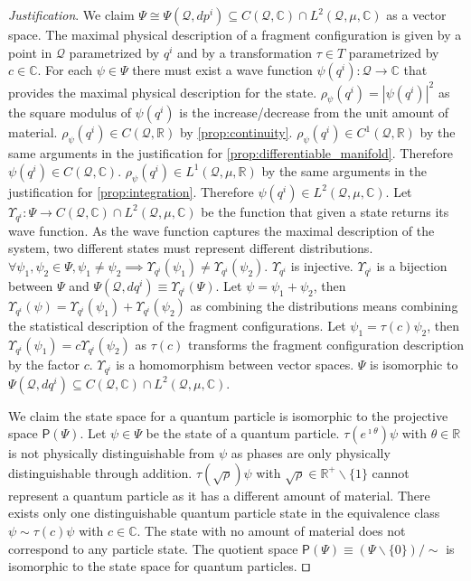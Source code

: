 \documentclass[smallextended]{svjour3}
\numberwithin{equation}{section}
\newenvironment{justification}{\emph{Justification}.}{\hfill\(\qed\)}
\begin{document}
\begin{justification}
	We claim $\Psi \cong \Psi(\mathcal{Q}, dp^i) \subseteq C(\mathcal{Q}, \mathbb{C}) \cap L^2(\mathcal{Q}, \mu, \mathbb{C})$ as a vector space. The maximal physical description of a fragment configuration is given by a point in $\mathcal{Q}$ parametrized by $q^i$ and by a transformation $\tau \in T$ parametrized by $c \in \mathbb{C}$. For each $\psi \in \Psi$ there must exist a wave function $\psi(q^i) : \mathcal{Q} \rightarrow \mathbb{C}$ that provides the maximal physical description for the state. $\rho_\psi(q^i) = |\psi(q^i)|^2$ as the square modulus of $\psi(q^i)$ is the increase/decrease from the unit amount of material. $\rho_\psi(q^i) \in C(\mathcal{Q}, \mathbb{R})$ by \ref{prop:continuity}. $\rho_\psi(q^i) \in C^1(\mathcal{Q}, \mathbb{R})$ by the same arguments in the justification for \ref{prop:differentiable_manifold}. Therefore $\psi(q^i) \in C(\mathcal{Q}, \mathbb{C})$. $\rho_\psi(q^i) \in L^1(\mathcal{Q}, \mu, \mathbb{R})$ by the same arguments in the justification for \ref{prop:integration}. Therefore $\psi(q^i) \in L^2(\mathcal{Q}, \mu, \mathbb{C})$. Let $\Upsilon_{q^i} : \Psi \rightarrow C(\mathcal{Q}, \mathbb{C}) \cap L^2(\mathcal{Q}, \mu, \mathbb{C})$ be the function that given a state returns its wave function. As the wave function captures the maximal description of the system, two different states must represent different distributions. $\forall \psi_1, \psi_2 \in \Psi, \psi_1 \neq \psi_2 \implies \Upsilon_{q^i}(\psi_1) \neq \Upsilon_{q^i}(\psi_2)$. $\Upsilon_{q^i}$ is injective. $\Upsilon_{q^i}$ is a bijection between $\Psi$ and $\Psi(\mathcal{Q}, dq^i)\equiv\Upsilon_{q^i}(\Psi)$. Let $\psi=\psi_1+\psi_2$, then $\Upsilon_{q^i}(\psi)=\Upsilon_{q^i}(\psi_1)+\Upsilon_{q^i}(\psi_2)$ as combining the distributions means combining the statistical description of the fragment configurations. Let $\psi_1=\tau(c)\psi_2$, then $\Upsilon_{q^i}(\psi_1)=c \Upsilon_{q^i}(\psi_2)$ as $\tau(c)$ transforms the fragment configuration description by the factor $c$. $\Upsilon_{q^i}$ is a homomorphism between vector spaces. $\Psi$ is isomorphic to $\Psi(\mathcal{Q}, dq^i) \subseteq C(\mathcal{Q}, \mathbb{C}) \cap L^2(\mathcal{Q}, \mu, \mathbb{C})$.
	
	We claim the state space for a quantum particle is isomorphic to the projective space $\mathsf{P}(\Psi)$. Let $\psi \in \Psi$ be the state of a quantum particle. $\tau(e^{\imath \theta}) \psi$ with $\theta \in \mathbb{R}$ is not physically distinguishable from $\psi$ as phases are only physically distinguishable through addition. $\tau(\sqrt{\rho}) \psi$ with $\sqrt{\rho} \in \mathbb{R}^+ \backslash \{1\}$ cannot represent a quantum particle as it has a different amount of material. There exists only one distinguishable quantum particle state in the equivalence class $\psi \sim \tau(c) \psi$ with $c \in \mathbb{C}$. The state with no amount of material does not correspond to any particle state. The quotient space $\mathsf{P}(\Psi) \equiv (\Psi \backslash \{0\}) / \sim$ is isomorphic to the state space for quantum particles.
\end{justification}
\end{document}
